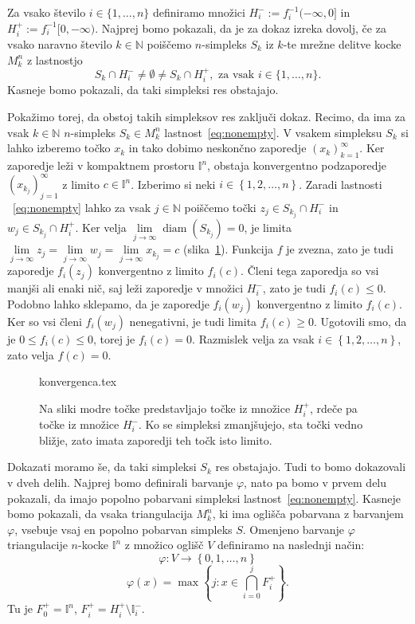 \documentclass[mat1]{fmfdelo}
\newcommand{\N}{\mathbb N}
\DeclareMathOperator{\diam}{diam}
\newcommand{\I}{\mathbb I}
\newcommand{\0}{0}
\begin{document}
\begin{dokaz}
Za vsako število $i \in \{ 1, \dots, n\}$ definiramo množici $H_i^- := f_i^{-1} (-\infty, 0]$ in $H_i^+ := f_i^{-1} [0, -\infty)$. Najprej bomo pokazali, da je za dokaz izreka dovolj, če za vsako naravno število $k \in \N$ poiščemo $n$-simpleks $S_k$ iz $k$-te mrežne delitve kocke $M_k^n$ z lastnostjo 
\begin{equation}\label{eq:nonempty}
S_k \cap H_i^- \neq \emptyset \neq S_k \cap H_i^+, \text{ za vsak } i \in \{ 1, \dots, n \}.
\end{equation}
Kasneje bomo pokazali, da taki simpleksi res obstajajo.

Pokažimo torej, da obstoj takih simpleksov res zaključi dokaz. Recimo, da ima za vsak $k \in \N$ $n$-simpleks $S_k \in M_k^n$ lastnost~\eqref{eq:nonempty}. V vsakem simpleksu $S_k$ si lahko izberemo točko $x_k$ in tako dobimo neskončno zaporedje $\left ( x_k \right ) _{k = 1}^{\infty}$. Ker zaporedje leži v kompaktnem prostoru $\I^n$, obstaja konvergentno podzaporedje $\left ( x_{k_j} \right ) _{j = 1}^{\infty}$ z limito $c \in \I^n$. Izberimo si neki $i \in \left \{1, 2, \dots, n\right \}$. Zaradi lastnosti ~\eqref{eq:nonempty} lahko za vsak $j \in \N$ poiščemo točki $z_j \in S_{k_j} \cap H_i^-$ in $w_j \in S_{k_j} \cap H_i^+$. Ker velja $\lim\limits_{j \to \infty} \diam(S_{k_j}) = 0$, je limita  $\lim\limits_{j \to \infty} z_j = \lim\limits_{j \to \infty} w_j = \lim\limits_{j \to \infty} x_{k_j} = c$ (slika~\ref{fig:istalimita}). Funkcija $f$ je zvezna, zato je tudi zaporedje $f_i(z_j)$ konvergentno z limito $f_i(c)$. Členi tega zaporedja so vsi manjši ali enaki nič, saj leži zaporedje v množici $H_i^-$, zato je tudi $f_i(c) \leq 0$. Podobno lahko sklepamo, da je zaporedje $f_i(w_j)$ konvergentno z limito $f_i(c)$. Ker so vsi členi $f_i(w_j)$ nenegativni, je tudi limita $f_i(c) \geq 0$. Ugotovili smo, da je $0 \leq f_i(c) \leq 0$, torej je $f_i(c) = 0$. Razmislek velja za vsak $i \in \left \{1, 2, \dots, n\right \}$, zato velja $f(c) = \0$.
\begin{figure}[h!]
	\centering
	{konvergenca.tex}%
	\caption{Na sliki modre točke predstavljajo točke iz množice $H_i^+$, rdeče pa točke iz množice $H_i^-$. Ko se simpleksi zmanjšujejo, sta točki vedno bližje, zato imata zaporedji teh točk isto limito.}\label{fig:istalimita}
\end{figure}
Dokazati moramo še, da taki simpleksi $S_k$ res obstajajo. Tudi to bomo dokazovali v dveh delih. Najprej bomo definirali barvanje $\varphi$, nato pa bomo v prvem delu pokazali, da imajo popolno pobarvani simpleksi lastnost~\eqref{eq:nonempty}. Kasneje bomo pokazali, da vsaka triangulacija $M_k^n$, ki ima oglišča pobarvana z barvanjem $\varphi$, vsebuje vsaj en popolno pobarvan simpleks $S$.
Omenjeno barvanje $\varphi$ triangulacije $n$-kocke $\I^n$ z množico oglišč $V$ definiramo na naslednji način:
$$\varphi : V \to \left \{ 0, 1, \dots, n \right \}$$
$$\varphi(x) = \max \left \{ j : x \in \bigcap_{i=0}^j F_i^+\right \}.$$
Tu je $ F_0^+ = \I^n$, $ F_i^+ =  H_i^+ \setminus \I_i^-$.


\end{dokaz}
\end{document}
